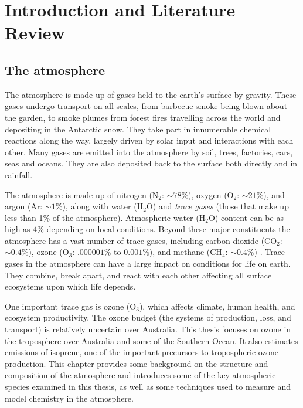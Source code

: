 \chapter{Introduction and Literature Review} %
\label{LR}

\section{The atmosphere}
\label{LR:Atmos}
  The atmosphere is made up of gases held to the earth's surface by gravity. 
  These gases undergo transport on all scales, from barbecue smoke being blown about the garden, to smoke plumes from forest fires travelling across the world and depositing in the Antarctic snow.
  They take part in innumerable chemical reactions along the way, largely driven by solar input and interactions with each other.
  Many gases are emitted into the atmosphere by soil, trees, factories, cars, seas and oceans.
  They are also deposited back to the surface both directly and in rainfall.
  
  The atmosphere is made up of nitrogen (N$_2$: $\sim 78\%$), oxygen (O$_2$: $\sim 21\%$), and argon (Ar: $\sim 1\%$), along with water (H$_2$O) and \textit{trace gases} (those that make up less than 1\% of the atmosphere).
  Atmospheric water (H$_2$O) content can be as high as $4\%$ depending on local conditions.
  Beyond these major constituents the atmosphere has a vast number of trace gases, including carbon dioxide (CO$_2$: $\sim 0.4\%$), ozone (O$_3$: $.000001\%$ to $0.001\%$), and methane (CH$_4$: $\sim 0.4\%$) \parencite[][Ch. 2]{BrasseurJacob2017}.
  Trace gases in the atmosphere can have a large impact on conditions for life on earth.
  They combine, break apart, and react with each other affecting all surface ecosystems upon which life depends.
  
  One important trace gas is ozone (O$_3$), which affects climate, human health, and ecosystem productivity.
  The ozone budget (the systems of production, loss, and transport) is relatively uncertain over Australia.
  This thesis focuses on ozone in the troposphere over Australia and some of the Southern Ocean.
  It also estimates emissions of isoprene, one of the important precursors to tropospheric ozone production.
  This chapter provides some background on the structure and composition of the atmosphere and introduces some of the key atmospheric species examined in this thesis, as well as some techniques used to measure and model chemistry in the atmosphere.
  
